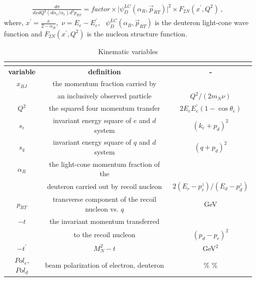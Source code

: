 \documentclass[12pt,letterpaper]{article}
\begin{document}
\begin{eqnarray}\label{eq:CrossSection}
\frac{d\sigma}{dx dQ^2 (d\alpha_r/\alpha_r) d^2p_{RT}} = factor \times \Big|\psi^{LC}_D(\alpha_R, \vec{p}_{RT})\Big|^2\times F_{2N}(x^{\prime}, Q^2)~,
\end{eqnarray}
where, $x^{\prime}=\frac{x}{2-\alpha_R}$,~$\nu= E_e - E_e^{\prime}$, ~$\psi^{LC}_D(\alpha_R, \vec{p}_{RT})$ is the deuteron light-cone wave function and $F_{2N}(x^{\prime}, Q^2)$ is the nucleon structure function.

\begin{table}[h]
\begin{center}
\begin{tabular}{|c|c|c|}
\multicolumn{3}{c}{} \\ 
\hline
{\bf variable} &{\bf definition} &{\bf - }  \\ \hline\hline
$x_{BJ}$ & the momentum fraction carried by & \\
        & an inclusively observed particle &  $ Q^2/(2m_N \nu)$ \\ \hline
$Q^2$ & the squared four momentum transfer &   $2E_eE_e^{\prime}(1-\cos\theta_e)$\\ \hline
$s_e$ & invariant energy square of $e$ and $d$ system & $(k_e + p_d)^2$    \\ \hline
$s_q$ & invariant energy square of $q$ and $d$ system & $(q + p_d)^2$   \\ \hline
$\alpha_R$ & the light-cone momentum fraction of the &   \\
           & deuteron carried out by recoil nucleon & $2(E_r - p_{r}^z)/(E_d - p_{d}^z)$    \\ \hline
$p_{RT}$ & transverse component of the recoil nucleon vs. $q$& GeV   \\ \hline
$-t$ & the invariant momentum transferred   &   \\ 
 & to the recoil nucleon  &  $(p_d - p_r)^2$  \\ \hline
$-t^{\prime}$ & $M_N^2 - t$  & GeV$^2$   \\ \hline
 $Pol_e$, $Pol_d$  & beam polarization of electron, deuteron& \%  \%   \\ \hline
\end{tabular}\\
\caption[Kinematic Variables]{\label{tab:Variables} Kinematic variables}
\end{center}
\end{table}
\end{document}
